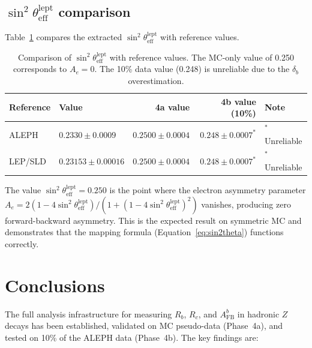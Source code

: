\documentclass[11pt,a4paper]{article}
\begin{document}
\subsection{$\sin^2\theta_\mathrm{eff}^\mathrm{lept}$ comparison}
\label{sec:sin2theta_comparison}

Table~\ref{tab:sin2theta_comparison} compares the extracted $\sin^2\theta_\mathrm{eff}^\mathrm{lept}$
with reference values.

\begin{table}[htbp]
\centering
\caption{Comparison of $\sin^2\theta_\mathrm{eff}^\mathrm{lept}$ with reference values.
The MC-only value of 0.250 corresponds to $A_e = 0$. The 10\% data value (0.248) is
unreliable due to the $\delta_b$ overestimation.}
\label{tab:sin2theta_comparison}
\begin{tabular}{llrrl}
\toprule
Reference & Value & 4a value & 4b value (10\%) & Note \\
\midrule
ALEPH~\cite{ALEPH:AFBb} & $0.2330 \pm 0.0009$ & $0.2500 \pm 0.0004$ & $0.248 \pm 0.0007^{*}$ & $^{*}$Unreliable \\
LEP/SLD~\cite{LEP:EWWG:2005} & $0.23153 \pm 0.00016$ & $0.2500 \pm 0.0004$ & $0.248 \pm 0.0007^{*}$ & $^{*}$Unreliable \\
\bottomrule
\end{tabular}
\end{table}

The value $\sin^2\theta_\mathrm{eff}^\mathrm{lept} = 0.250$ is the point where
the electron asymmetry parameter $A_e = 2(1 - 4\sin^2\theta_\mathrm{eff}^\mathrm{lept})/
(1 + (1 - 4\sin^2\theta_\mathrm{eff}^\mathrm{lept})^2)$ vanishes, producing zero
forward-backward asymmetry. This is the expected result on symmetric MC and demonstrates
that the mapping formula (Equation~\ref{eq:sin2theta}) functions correctly.

\FloatBarrier
{}
\section{Conclusions}
\label{sec:conclusions}

The full analysis infrastructure for measuring $R_b$, $R_c$, and $A_\mathrm{FB}^b$ in
hadronic $Z$ decays has been established, validated on MC pseudo-data (Phase~4a), and
tested on 10\% of the ALEPH data (Phase~4b). The key findings are:
\end{document}
